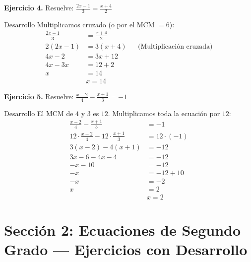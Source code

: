 \documentclass[letterpaper, 12pt]{article}
\begin{document}
\vspace{0.4cm}

\textbf{Ejercicio 4.} Resuelve: $\displaystyle\frac{2x - 1}{3} = \frac{x + 4}{2}$

\begin{solucionbox}{Desarrollo}
Multiplicamos cruzado (o por el MCM $= 6$):
\begin{align*}
    \frac{2x - 1}{3} &= \frac{x + 4}{2} \\[6pt]
    2(2x - 1) &= 3(x + 4) && \text{(Multiplicación cruzada)} \\
    4x - 2 &= 3x + 12 \\
    4x - 3x &= 12 + 2 \\
    x &= 14 \\[4pt]
    &\boxed{x = 14}
\end{align*}
\end{solucionbox}

\vspace{0.4cm}

\textbf{Ejercicio 5.} Resuelve: $\displaystyle\frac{x - 2}{4} - \frac{x + 1}{3} = -1$

\begin{solucionbox}{Desarrollo}
El MCM de $4$ y $3$ es $12$. Multiplicamos toda la ecuación por $12$:
\begin{align*}
    \frac{x - 2}{4} - \frac{x + 1}{3} &= -1 \\[6pt]
    12 \cdot \frac{x-2}{4} - 12 \cdot \frac{x+1}{3} &= 12 \cdot (-1) \\[6pt]
    3(x - 2) - 4(x + 1) &= -12 \\
    3x - 6 - 4x - 4 &= -12 \\
    -x - 10 &= -12 \\
    -x &= -12 + 10 \\
    -x &= -2 \\
    x &= 2 \\[4pt]
    &\boxed{x = 2}
\end{align*}
\end{solucionbox}

\newpage

\section*{Sección 2: Ecuaciones de Segundo Grado — Ejercicios con Desarrollo}
\end{document}

